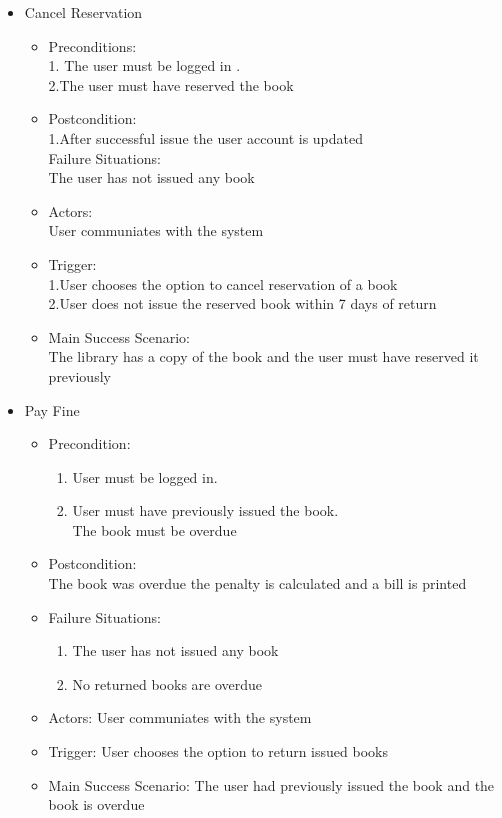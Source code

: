 \documentclass{article}
\begin{document}
\begin{enumerate}
\begin{itemize}
 \item Cancel Reservation\\
 \begin{itemize}
 \item  Preconditions:\\
 1. The user must be logged in .\\
 2.The user must have reserved the book\\
 \item Postcondition:\\
 1.After successful issue the user account is updated \\
Failure Situations:\\The user has not issued any book\\
 \item Actors: \\User communiates with the system\\
 \item Trigger:\\ 
 1.User chooses the option to cancel reservation of a book \\
 2.User does not issue the reserved book within 7 days of return\\
 \item Main Success Scenario:\\ The library has a copy of the book and the user must have reserved it previously\\
	
 \end{itemize}

\item Pay Fine\\
	\begin{itemize}
	\item  Precondition:\\
	\begin{enumerate}	
	\item User must be logged in.\\
	\item User must have previously issued the book.\\The book must be overdue\\
	\end{enumerate}
 \item Postcondition:\\
  The book was overdue the penalty is calculated and a bill is printed 
 \item Failure Situations:
 \begin{enumerate}
 \item The user has not issued any book
  \item No returned books are overdue
	\end{enumerate} 
 \item Actors: User communiates with the system
 \item Trigger: User chooses the option to return issued books
 \item Main Success Scenario: The user had previously issued the book and the book is overdue
	\end{itemize}
\end{itemize}



\end{enumerate}
\end{document}
